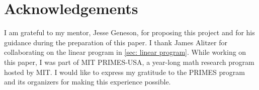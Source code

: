 \documentclass[12pt]{amsart}
\theoremstyle{definition}
\numberwithin{equation}{section}
\numberwithin{table}{thm}
\begin{document}
\section*{Acknowledgements}
I am grateful to my mentor, Jesse Geneson, for proposing this project and for his guidance during the preparation of this paper. I thank James Alitzer for collaborating on the linear program in \cref{sec: linear program}. While working on this paper, I was part of MIT PRIMES-USA, a year-long math research program hosted by MIT. I would like to express my gratitude to the PRIMES program and its organizers for making this experience possible. 

\printbibliography
\end{document}
